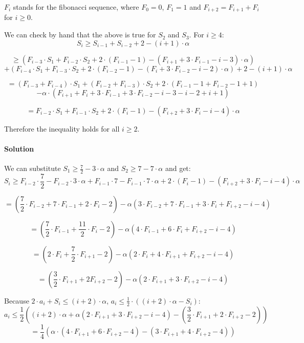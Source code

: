 \documentclass[12pt, A4]{article}
\begin{document}
$F_i$ stands for the fibonacci sequence, where $F_0 = 0$, $F_1 = 1$ and $F_{i+2} = F_{i+1} + F_i$ for $i \ge 0$.

We can check by hand that the above is true for $S_2$ and $S_3$. For $i \ge 4$:
\[
S_i \ge S_{i-1} + S_{i-2} + 2 - (i+1) \cdot \alpha
\]

\[
\ge \left(F_{i-3} \cdot S_1 + F_{i-2} \cdot S_2 + 2 \cdot (F_{i-1} - 1) - (F_{i+1} + 3 \cdot F_{i-1} - i - 3) \cdot \alpha\right)
\]
\[
+ \left(F_{i-4} \cdot S_1 + F_{i-3} \cdot S_2 + 2 \cdot (F_{i-2} - 1) - (F_i + 3 \cdot F_{i-2} - i - 2) \cdot \alpha\right)
+ 2 - (i+1) \cdot \alpha
\]

\[
= (F_{i-3} + F_{i-4}) \cdot S_1 + (F_{i-2} + F_{i-3}) \cdot S_2 + 2 \cdot (F_{i-1} - 1 + F_{i-2} - 1 + 1)
\]
\[
- \alpha \cdot \left(F_{i+1} + F_i + 3 \cdot F_{i-1} + 3 \cdot F_{i-2} - i - 3 - i - 2 + i + 1\right)
\]

\[
= F_{i-2} \cdot S_1 + F_{i-1} \cdot S_2 + 2 \cdot (F_i - 1) - (F_{i+2} + 3 \cdot F_i - i - 4) \cdot \alpha
\]

Therefore the inequality holds for all $i \ge 2$.


\paragraph{Solution}
We can substitute $S_1 \ge \frac{7}{2} - 3 \cdot \alpha$ and $S_2 \ge 7 - 7 \cdot \alpha$ and get:
\[
S_i \ge F_{i-2} \cdot \frac{7}{2} - F_{i-2} \cdot 3 \cdot \alpha + F_{i-1} \cdot 7 - F_{i-1} \cdot 7 \cdot \alpha + 2 \cdot (F_i - 1) - (F_{i+2} + 3 \cdot F_i - i - 4) \cdot \alpha
\]

\[
= \left(\frac{7}{2} \cdot F_{i-2} + 7 \cdot F_{i-1} + 2 \cdot F_i - 2\right)
- \alpha \left(3 \cdot F_{i-2} + 7 \cdot F_{i-1} + 3 \cdot F_i + F_{i+2} - i - 4\right)
\]

\[
= \left(\frac{7}{2} \cdot F_{i-1} + \frac{11}{2} \cdot F_i - 2\right)
- \alpha \left(4 \cdot F_{i-1} + 6 \cdot F_i + F_{i+2} - i - 4\right)
\]

\[
= \left(2 \cdot F_i + \frac{7}{2} \cdot F_{i+1} - 2\right)
- \alpha \left(2 \cdot F_i + 4 \cdot F_{i+1} + F_{i+2} - i - 4\right)
\]

\[
= \left(\frac{3}{2} \cdot F_{i+1} + 2 F_{i+2} - 2\right)
- \alpha \left(2 \cdot F_{i+1} + 3 \cdot F_{i+2} - i - 4\right)
\]

Because $2 \cdot a_i + S_i \le (i+2) \cdot \alpha$, $a_i \le \frac{1}{2} \cdot ((i+2) \cdot \alpha - S_i)$:
\[
a_i \le \frac{1}{2}\left((i+2) \cdot \alpha + \alpha \left(2 \cdot F_{i+1} + 3 \cdot F_{i+2} - i - 4\right) - \left(\frac{3}{2} \cdot F_{i+1} + 2 \cdot F_{i+2} - 2\right)\right)
\]
\[
= \frac{1}{4}\left(\alpha \cdot \left(4 \cdot F_{i+1} + 6 \cdot F_{i+2} - 4\right) - \left(3 \cdot F_{i+1} + 4 \cdot F_{i+2} - 4\right)\right)
\]
\end{document}
